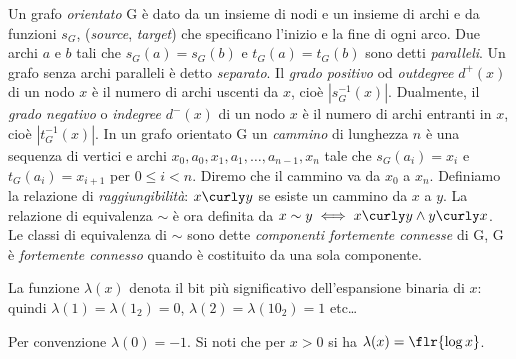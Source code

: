 Un grafo \textit{orientato} G è dato da un insieme di nodi  e un insieme di archi  e da funzioni $s_G$,  (\textit{source}, \textit{target}) che specificano l'inizio e la fine di ogni arco. Due archi $a$ e $b$ tali che $s_G(a) = s_G(b)$ e $t_G(a) = t_G(b)$ sono detti \textit{paralleli}. Un grafo senza archi paralleli è detto \textit{separato}. Il \textit{grado positivo} od \textit{outdegree} $d^+(x)$ di un nodo $x$ è il numero di archi uscenti da $x$, cioè $|s_G^{-1}(x)|$. Dualmente, il \textit{grado negativo} o \textit{indegree} $d^-(x)$ di un nodo $x$ è il numero di archi entranti in $x$, cioè $|t_G^{-1}(x)|$. In un grafo orientato G un \textit{cammino} di lunghezza $n$ è una sequenza di vertici e archi $x_0, a_0, x_1, a_1, \dots, a_{n - 1}, x_n$ tale che $s_G(a_i) = x_i$ e $t_G(a_i) = x_{i + 1}$ per $0 \leq i < n$. Diremo che il cammino va da $x_0$ a $x_n$.
Definiamo la relazione di \textit{raggiungibilità}: $x \curly y$ se esiste un cammino da $x$ a $y$. La relazione di equivalenza $\sim$ è ora definita da $x \sim y \iff x \curly y \land y \curly x$. Le classi di equivalenza di $\sim$ sono dette \textit{componenti fortemente connesse} di G, G è \textit{fortemente connesso} quando è costituito da una sola componente.

La funzione $\lambda(x)$ denota il bit più significativo dell'espansione binaria di $x$: quindi $\lambda(1) = \lambda(1_2) = 0$, $\lambda(2) = \lambda(10_2) = 1$ etc\dots

Per convenzione $\lambda(0) = -1$. Si noti che per $x > 0$ si ha $\lambda(x) = \flr{\log{x}}$.
